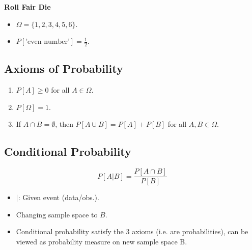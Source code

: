 \begin{example} \textbf{Roll Fair Die}
    \begin{itemize}
        \item $\Omega = \{1, 2, 3, 4, 5, 6\}$.
        \item $P[\text{'even number'}] = \frac{1}{2}$.
    \end{itemize}
\end{example}

\subsection{Axioms of Probability}
\begin{definition}
    \begin{enumerate}
        \item $P[A] \geq 0$ for all $A \in \Omega$.
        \item $P[\Omega] = 1$.
        \item If $A \cap B = \emptyset$, then $P[A \cup B] = P[A] + P[B]$ for all $A, B \in \Omega$.
    \end{enumerate}
\end{definition}

\subsection{Conditional Probability}
\begin{definition}
    \begin{equation}
        P[A|B] = \frac{P[A \cap B]}{P[B]}
    \end{equation}
    \begin{itemize}
        \item $|$: Given event (data/obs.).
    \end{itemize}
\end{definition}

\begin{notes}
    \begin{itemize}
        \item Changing sample space to $B$.
        \item Conditional probability satisfy the 3 axioms (i.e. are probabilities), can be viewed as probability measure on new sample space B.
    \end{itemize}
\end{notes}

